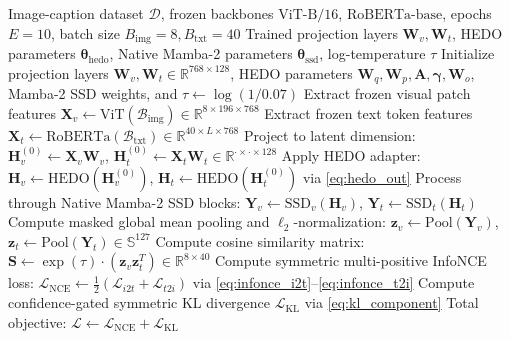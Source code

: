 \documentclass[10pt,journal,final]{IEEEtran}
\begin{document}
\begin{algorithm}[htbp]
\caption{Training Procedure for Native Mamba-2 + HEDO}
\label{alg:training}
\begin{algorithmic}[1]
\REQUIRE Image-caption dataset $\mathcal{D}$, frozen backbones $\mathrm{ViT\text{-}B/16}$, $\mathrm{RoBERTa\text{-}base}$, epochs $E=10$, batch size $B_{\mathrm{img}}=8, B_{\mathrm{txt}}=40$
\ENSURE Trained projection layers $\mathbf{W}_v, \mathbf{W}_t$, HEDO parameters $\boldsymbol{\theta}_{\mathrm{hedo}}$, Native Mamba-2 parameters $\boldsymbol{\theta}_{\mathrm{ssd}}$, log-temperature $\tau$
\STATE Initialize projection layers $\mathbf{W}_v, \mathbf{W}_t \in \mathbb{R}^{768 \times 128}$, HEDO parameters $\mathbf{W}_q, \mathbf{W}_p, \mathbf{A}, \boldsymbol{\gamma}, \mathbf{W}_o$, Mamba-2 SSD weights, and $\tau \leftarrow \log(1/0.07)$
        \STATE Extract frozen visual patch features $\mathbf{X}_v \leftarrow \mathrm{ViT}(\mathcal{B}_{\mathrm{img}}) \in \mathbb{R}^{8 \times 196 \times 768}$
        \STATE Extract frozen text token features $\mathbf{X}_t \leftarrow \mathrm{RoBERTa}(\mathcal{B}_{\mathrm{txt}}) \in \mathbb{R}^{40 \times L \times 768}$
        \STATE Project to latent dimension: $\mathbf{H}_v^{(0)} \leftarrow \mathbf{X}_v \mathbf{W}_v$, $\mathbf{H}_t^{(0)} \leftarrow \mathbf{X}_t \mathbf{W}_t \in \mathbb{R}^{\cdot \times \cdot \times 128}$
        \STATE Apply HEDO adapter: $\mathbf{H}_v \leftarrow \mathrm{HEDO}(\mathbf{H}_v^{(0)})$, $\mathbf{H}_t \leftarrow \mathrm{HEDO}(\mathbf{H}_t^{(0)})$ via \eqref{eq:hedo_out}
        \STATE Process through Native Mamba-2 SSD blocks: $\mathbf{Y}_v \leftarrow \mathrm{SSD}_v(\mathbf{H}_v)$, $\mathbf{Y}_t \leftarrow \mathrm{SSD}_t(\mathbf{H}_t)$
        \STATE Compute masked global mean pooling and $\ell_2$-normalization: $\mathbf{z}_v \leftarrow \mathrm{Pool}(\mathbf{Y}_v)$, $\mathbf{z}_t \leftarrow \mathrm{Pool}(\mathbf{Y}_t) \in \mathbb{S}^{127}$
        \STATE Compute cosine similarity matrix: $\mathbf{S} \leftarrow \exp(\tau) \cdot (\mathbf{z}_v \mathbf{z}_t^T) \in \mathbb{R}^{8 \times 40}$
        \STATE Compute symmetric multi-positive InfoNCE loss: $\mathcal{L}_{\mathrm{NCE}} \leftarrow \frac{1}{2}(\mathcal{L}_{i2t} + \mathcal{L}_{t2i})$ via \eqref{eq:infonce_i2t}--\eqref{eq:infonce_t2i}
            \STATE Compute confidence-gated symmetric KL divergence $\mathcal{L}_{\mathrm{KL}}$ via \eqref{eq:kl_component}
            \STATE Total objective: $\mathcal{L} \leftarrow \mathcal{L}_{\mathrm{NCE}} + \mathcal{L}_{\mathrm{KL}}$

\end{algorithmic}
\end{algorithm}
\end{document}
